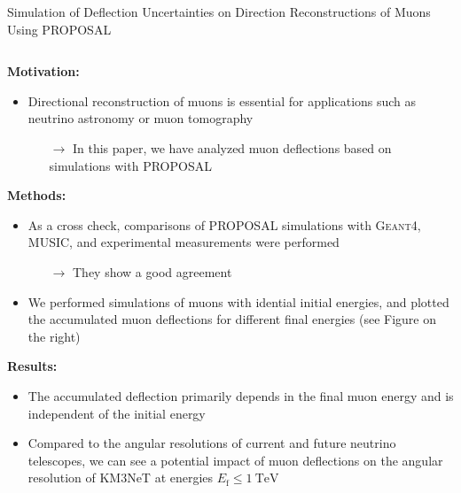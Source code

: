 \documentclass[t]{beamer}
\newlength{\itemseparation}
\begin{document}
\begin{columns}[onlytextwidth]
\begin{column}{\textwidth}
\begin{block}[equal height group=J]{Simulation of Deflection Uncertainties on Direction Reconstructions of Muons Using PROPOSAL}
\begin{columns}[onlytextwidth]
\begin{column}{0.33\textwidth}
            \textbf{Motivation:}
            \begin{itemize}
              \setlength\itemsep{\itemseparation}
              \item Directional reconstruction of muons is essential for applications such as neutrino astronomy or muon tomography
              \begin{itemize}
                \item[$\rightarrow$] In this paper, we have analyzed muon deflections based on simulations with PROPOSAL
              \end{itemize}
            \end{itemize}
            \textbf{Methods:} 
            \begin{itemize}
              \setlength\itemsep{\itemseparation}
              \item As a cross check, comparisons of PROPOSAL simulations with \textsc{Geant4}, MUSIC, and experimental measurements were performed
              \begin{itemize}
                \item[$\rightarrow$] They show a good agreement
              \end{itemize}
              \item We performed simulations of muons with idential initial energies, and plotted the accumulated muon deflections for different final energies (see Figure on the right)
            \end{itemize}
            \textbf{Results:}
            \begin{itemize}
                \setlength\itemsep{\itemseparation}
                \item The accumulated deflection primarily depends in the final muon energy and is independent of the initial energy
                \item Compared to the angular resolutions of current and future neutrino telescopes, we can see a potential impact of muon deflections on the angular resolution of KM3NeT at energies $E_\text{f} \leq \SI{1}{\tera\electronvolt}$
            \end{itemize}


\end{column}
\end{columns}
\end{block}
\end{column}
\end{columns}
\end{document}
